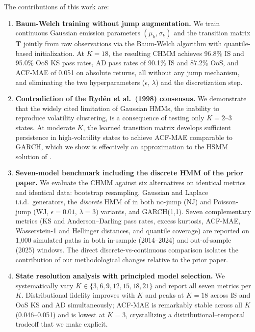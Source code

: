 The contributions of this work are:
\begin{enumerate}
    \item \textbf{Baum-Welch training without jump augmentation.}
    We train continuous Gaussian emission parameters $(\mu_k, \sigma_k)$ and the transition matrix $\mathbf{T}$ jointly from raw observations via the Baum-Welch algorithm with quantile-based initialization.
    At $K = 18$, the resulting CHMM achieves 96.8\% IS and 95.0\% OoS KS pass rates, AD pass rates of 90.1\% IS and 87.2\% OoS, and ACF-MAE of 0.051 on absolute returns, all without any jump mechanism, and eliminating the two hyperparameters ($\epsilon$, $\lambda$) and the discretization step.

    \item \textbf{Contradiction of the Ryd\'{e}n et al.\ (1998) consensus.}
    We demonstrate that the widely cited limitation of Gaussian HMMs, the inability to reproduce volatility clustering, is a consequence of testing only $K = 2$--$3$ states.
    At moderate $K$, the learned transition matrix develops sufficient persistence in high-volatility states to achieve ACF-MAE comparable to GARCH, which we show is effectively an approximation to the HSMM solution of \citet{bulla2006stylized}.

    \item \textbf{Seven-model benchmark including the discrete HMM of the prior paper.}
    We evaluate the CHMM against six alternatives on identical metrics and identical data: bootstrap resampling, Gaussian and Laplace i.i.d.\ generators, the \emph{discrete} HMM of \citet{alswaidan2026hybrid} in both no-jump (NJ) and Poisson-jump (WJ, $\epsilon = 0.01$, $\lambda = 3$) variants, and GARCH(1,1).
    Seven complementary metrics (KS and Anderson--Darling pass rates, excess kurtosis, ACF-MAE, Wasserstein-1 and Hellinger distances, and quantile coverage) are reported on 1{,}000 simulated paths in both in-sample (2014--2024) and out-of-sample (2025) windows.
    The direct discrete-vs-continuous comparison isolates the contribution of our methodological changes relative to the prior paper.

    \item \textbf{State resolution analysis with principled model selection.}
    We systematically vary $K \in \{3, 6, 9, 12, 15, 18, 21\}$ and report all seven metrics per $K$.
    Distributional fidelity improves with $K$ and peaks at $K = 18$ across IS and OoS KS and AD simultaneously; ACF-MAE is remarkably stable across all $K$ (0.046--0.051) and is lowest at $K = 3$, crystallizing a distributional--temporal tradeoff that we make explicit.


\end{enumerate}
